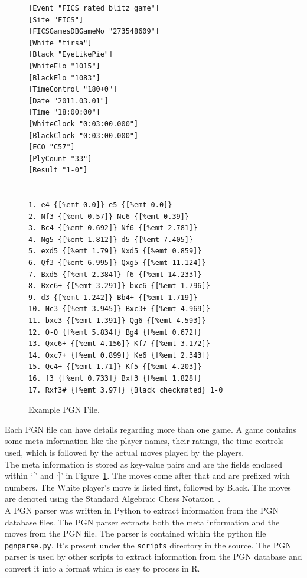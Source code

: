 \documentclass{article}
\begin{document}
\begin{figure}[htp]
\begin{center}
\begin{verbatim}
[Event "FICS rated blitz game"]
[Site "FICS"]
[FICSGamesDBGameNo "273548609"]
[White "tirsa"]
[Black "EyeLikePie"]
[WhiteElo "1015"]
[BlackElo "1083"]
[TimeControl "180+0"]
[Date "2011.03.01"]
[Time "18:00:00"]
[WhiteClock "0:03:00.000"]
[BlackClock "0:03:00.000"]
[ECO "C57"]
[PlyCount "33"]
[Result "1-0"]


1. e4 {[%emt 0.0]} e5 {[%emt 0.0]} 
2. Nf3 {[%emt 0.57]} Nc6 {[%emt 0.39]} 
3. Bc4 {[%emt 0.692]} Nf6 {[%emt 2.781]} 
4. Ng5 {[%emt 1.812]} d5 {[%emt 7.405]} 
5. exd5 {[%emt 1.79]} Nxd5 {[%emt 0.859]} 
6. Qf3 {[%emt 6.995]} Qxg5 {[%emt 11.124]} 
7. Bxd5 {[%emt 2.384]} f6 {[%emt 14.233]} 
8. Bxc6+ {[%emt 3.291]} bxc6 {[%emt 1.796]} 
9. d3 {[%emt 1.242]} Bb4+ {[%emt 1.719]} 
10. Nc3 {[%emt 3.945]} Bxc3+ {[%emt 4.969]} 
11. bxc3 {[%emt 1.391]} Qg6 {[%emt 4.593]} 
12. O-O {[%emt 5.834]} Bg4 {[%emt 0.672]} 
13. Qxc6+ {[%emt 4.156]} Kf7 {[%emt 3.172]} 
14. Qxc7+ {[%emt 0.899]} Ke6 {[%emt 2.343]} 
15. Qc4+ {[%emt 1.71]} Kf5 {[%emt 4.203]} 
16. f3 {[%emt 0.733]} Bxf3 {[%emt 1.828]} 
17. Rxf3# {[%emt 3.97]} {Black checkmated} 1-0

\end{verbatim}
\end{center}

\caption{Example PGN File.}
\label{fig:pgn}
\end{figure}

Each PGN file can have details regarding more than one game. A game contains some meta information like the player names, their ratings, the time controls used, which is followed by the actual moves played by the players.\\

The meta information is stored as key-value pairs and are the fields enclosed within `[' and `]' in Figure~\ref{fig:pgn}. The moves come after that and are prefixed with numbers. The White player's move is listed first, followed by Black. The moves are denoted using the Standard Algebraic Chess Notation~\cite{wiki:san}. \\

A PGN parser was written in Python to extract information from the PGN database files. The PGN parser extracts both the meta information and the moves from the PGN file. The parser is contained within the python file \verb=pgnparse.py=. It's present under the \verb=scripts= directory in the source. The PGN parser is used by other scripts to extract information from the PGN database and convert it into a format which is easy to process in R.
\end{document}
